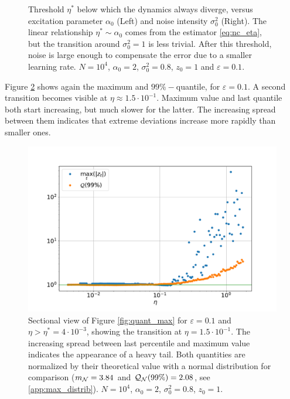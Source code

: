 \documentclass[FinalReport.tex]{subfiles}
\begin{document}
\begin{figure}[h!]
\centering
	\centering
	\caption{Threshold $\eta^*$ below which the dynamics always diverge, versus excitation parameter $\alpha_0$ (Left) and noise intensity $\sigma_0^2$ (Right). The linear relationship $\eta^*\sim\alpha_0$ comes from the estimator \eqref{eq:nc_eta}, but the transition around $\sigma_0^2=1$ is less trivial. After this threshold, noise is large enough to compensate the error due to a smaller learning rate. $N=10^4$, $\alpha_0=2$, $\sigma_0^2=0.8$, $z_0=1$ and $\varepsilon=0.1$.}%
	\label{fig:eta_div_a0_s0}	
\end{figure}

Figure \ref{fig:quant_max_eps_fixed} shows again the maximum and $99\%-$quantile, for $\varepsilon=0.1$. A second transition becomes visible at $\eta\approx1.5\cdot10^{-1}$. Maximum value and last quantile both start increasing, but much slower for the latter. The increasing spread between them indicates that extreme deviations increase more rapidly than smaller ones.

\begin{figure}[h!]
\centering
	\centering
	\includegraphics[width=.8\textwidth]{Graphs/quant_max_eps_fixed}
	\caption{Sectional view of Figure \ref{fig:quant_max} for $\varepsilon=0.1$ and $\eta>\eta^*=4\cdot10^{-3}$, showing the transition at $\eta=1.5\cdot10^{-1}$. The increasing spread between last percentile and maximum value indicates the appearance of a heavy tail.
	Both quantities are normalized by their theoretical value with a normal distribution for comparison ($m_{\mathcal{N}}=3.84$ and $\mathcal{Q}_{\mathcal{N}}(99\%)=2.08$, see \autoref{app:max_distrib}). $N=10^4$, $\alpha_0=2$, $\sigma_0^2=0.8$, $z_0=1$.}
	\label{fig:quant_max_eps_fixed}
\end{figure}
\end{document}
